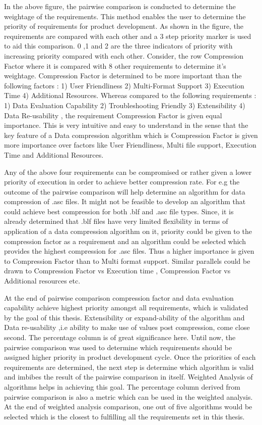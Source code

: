 In the above figure, the pairwise comparison is conducted to determine the weightage of the requirements. This method enables the user to determine the priority of requirements for product development. As shown in the figure, the requirements are compared with each other and a 3 step priority marker is used to aid this comparison. 0 ,1 and 2 are the three indicators of priority with increasing priority compared with each other. Consider, the row Compression Factor where it is compared with 8 other requirements to determine it's weightage. Compression Factor is determined to be more important than the following factors : 1) User Friendliness 2) Multi-Format Support 3) Execution Time 4) Additional Resources. Whereas compared to the following requirements : 1) Data Evaluation Capability 2) Troubleshooting Friendly 3) Extensibility 4) Data Re-usability , the requirement Compression Factor is given equal importance. This is very intuitive and easy to understand in the sense that the key feature of a Data compression algorithm which is Compression Factor is given more importance over factors like User Friendliness, Multi file support, Execution Time and Additional Resources.

Any of the above four requirements can be compromised or rather given a lower priority of execution in order to achieve better compression rate. For e.g the outcome of the pairwise comparison will help determine an algorithm for data compression of .asc files. It might not be feasible to develop an algorithm that could achieve best compression for both .blf and .asc file types. Since, it is already determined that .blf files have very limited flexibility in terms of application of a data compression algorithm on it, priority could be given to the compression factor as a requirement and an algorithm could be selected which provides the highest compression for .asc files. Thus a higher importance is given to Compression Factor than to Multi format support. Similar parallels could be drawn to Compression Factor vs Execution time , Compression Factor vs Additional resources etc.

At the end of pairwise comparison compression factor and data evaluation capability achieve highest priority amongst all requirements, which is validated by the goal of this thesis. Extensibility or expand-ability of the algorithm and Data re-usability ,i.e ability to make use of values post compression, come close second. The percentage column is of great significance here. Until now, the pairwise comparison was used to determine which requirements should be assigned higher priority in product development cycle. Once the priorities of each requirements are determined, the next step is determine which algorithm is valid and imbibes the result of the pairwise comparison in itself. Weighted Analysis of algorithms helps in achieving this goal. The percentage column derived from pairwise comparison is also a metric which can be used in the weighted analysis. At the end of weighted analysis comparison, one out of five algorithms would be selected which is the closest to fulfilling all the requirements set in this thesis. 

